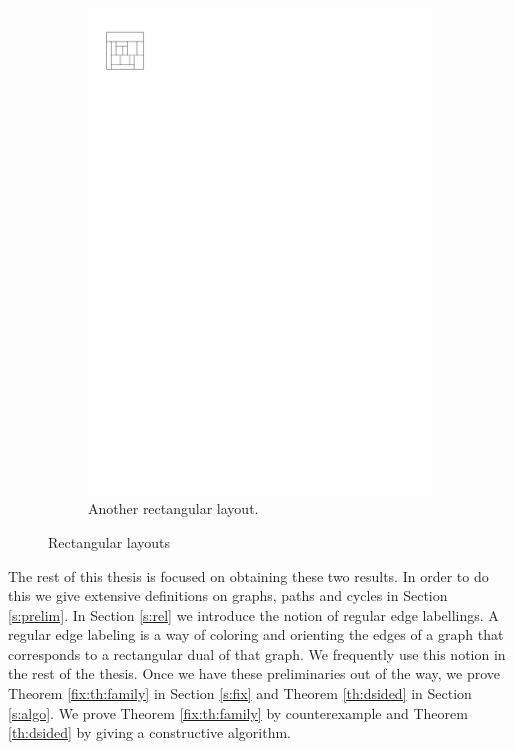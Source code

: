 \begin{figure}[b]
\begin{subfigure}[b]{0.45 \textwidth}
        \includegraphics[scale=1]{rectangularDuals/img/vertonesided}
        \caption{Another rectangular layout.}
        \label{fig:intr:vertonesided}
      \end{subfigure}
      \caption{Rectangular layouts}
      \label{fig:intr:graphs}
  \end{figure}

  The rest of this thesis is focused on obtaining these two results.
  In order to do this we give extensive definitions on graphs, paths and cycles in Section \ref{s:prelim}. In Section \ref{s:rel} we introduce the notion of regular edge labellings.  A regular edge labeling is a way of coloring and orienting the edges of a graph that corresponds to a rectangular dual of that graph.
  We frequently use this notion in the rest of the thesis.
  Once we have these preliminaries out of the way, we prove Theorem \ref{fix:th:family} in Section \ref{s:fix} and Theorem \ref{th:dsided} in Section \ref{s:algo}. We prove Theorem \ref{fix:th:family} by counterexample and Theorem \ref{th:dsided} by giving a constructive algorithm.
